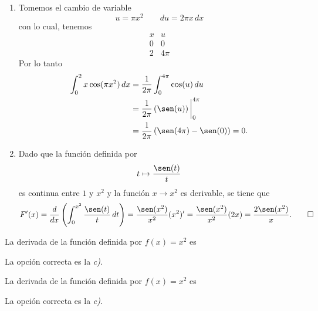 \documentclass[10pt,respuestas,a4]{aleph-examen}
\begin{document}
\begin{preguntas}
\begin{respuesta}
    \begin{enumerate}[leftmargin=*]
    \item 
        Tomemos el cambio de variable
        \[
            u = \pi x^2\qquad
            du = 2\pi x\, dx
        \]
        con lo cual, tenemos
    	\[
    	    \begin{array}{c|c}
    	        x & u\\ \hline
    	        0 & 0 \\
    	        2 & 4\pi
    	    \end{array}
    	\]
    	Por lo tanto
    	\begin{align*}
    	    \int_0^2 x\cos(\pi x^2)\,dx
    	    & = \frac{1}{2\pi}\int_0^{4\pi} \cos(u)\,du \\
    	    & = \frac{1}{2\pi}\left( \sen(u) \right)\bigg|_0^{4\pi}\\
    	    & = \frac{1}{2\pi}\left(\sen(4\pi)-\sen(0)\right)=0.
    	\end{align*}
    \item
        Dado que la función definida por 
        \[
            t\mapsto \frac{\sen(t)}{t}
        \]
        es continua entre $1$ y $x^2$ y la función $x\to x^2$ es derivable, se tiene que
        \[
            F'(x) 
            = \frac{d}{dx}\left(\int_0^{x^2} \frac{\sen(t)}{t}\, dt\right)
            = \frac{\sen(x^2)}{x^2}(x^2)'
            = \frac{\sen(x^2)}{x^2}(2x)
            = \frac{2\sen(x^2)}{x}.\qedhere
        \]
    \end{enumerate}    
    
\end{respuesta}

\item
    La derivada de la función definida por $f(x)=x^2$ es

\begin{respuesta}
    La opción correcta es la \textit{c)}.
\end{respuesta}
    

\item
    La derivada de la función definida por $f(x)=x^2$ es
    

\begin{respuesta}
    La opción correcta es la \textit{c)}.
\end{respuesta}

\end{preguntas}
\end{document}
